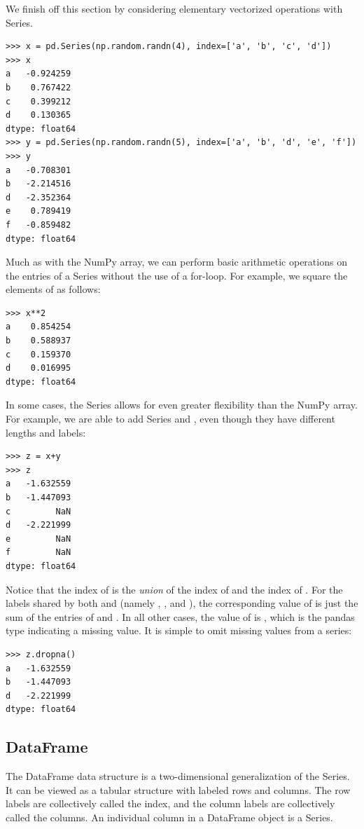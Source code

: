 We finish off this section by considering elementary vectorized operations with Series.
\begin{lstlisting}
>>> x = pd.Series(np.random.randn(4), index=['a', 'b', 'c', 'd'])
>>> x
a   -0.924259
b    0.767422
c    0.399212
d    0.130365
dtype: float64
>>> y = pd.Series(np.random.randn(5), index=['a', 'b', 'd', 'e', 'f'])
>>> y
a   -0.708301
b   -2.214516
d   -2.352364
e    0.789419
f   -0.859482
dtype: float64
\end{lstlisting}
Much as with the NumPy array, we can perform basic arithmetic operations on the entries of
a Series without the use of a for-loop. For example, we square the elements of  as
follows:
\begin{lstlisting}
>>> x**2
a    0.854254
b    0.588937
c    0.159370
d    0.016995
dtype: float64
\end{lstlisting}
In some cases, the Series allows for even greater flexibility than the NumPy array. For example,
we are able to add Series  and , even though they have different lengths and labels:
\begin{lstlisting}
>>> z = x+y
>>> z
a   -1.632559
b   -1.447093
c         NaN
d   -2.221999
e         NaN
f         NaN
dtype: float64
\end{lstlisting}
Notice that the index of  is the \emph{union} of the index of  and the index of .
For the labels shared by both  and  (namely , , and ), the corresponding
value of  is just the sum of the entries of  and . In all other cases, the value of
 is , which is the pandas type indicating a missing value. It is simple to omit missing
values from a series:
\begin{lstlisting}
>>> z.dropna()
a   -1.632559
b   -1.447093
d   -2.221999
dtype: float64
\end{lstlisting}




\subsection*{DataFrame}
The DataFrame data structure is a two-dimensional generalization of the Series. It can be viewed
as a tabular structure with labeled rows and columns. The row labels are collectively called the
index, and the column labels are collectively called the columns. An individual column in a
DataFrame object is a Series.

